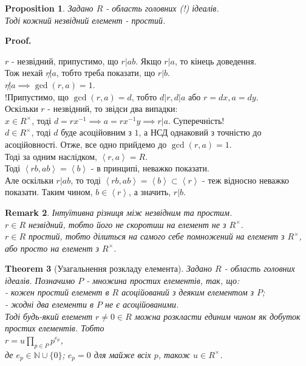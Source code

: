 \documentclass[a4paper, 14pt]{extarticle}
\makeatletter
\theoremstyle{theoremdd}
\newtheorem{theorem}{Theorem}[subsection]
\theoremstyle{theoremdd}
\theoremstyle{theoremdd}
\theoremstyle{theoremdd}
\theoremstyle{theoremdd}
\newtheorem{proposition}[theorem]{Proposition}
\theoremstyle{theoremdd}
\newtheorem{remark}[theorem]{Remark}
\theoremstyle{theoremdd}
\theoremstyle{theoremdd}
\def\qed{$\blacksquare$}
\renewenvironment{proof}[1][Proof.\\]{\par
\pushQED{\hfill \qed}%
\normalfont \topsep6\p@\@plus6\p@\relax
\trivlist
\item\relax
{\bfseries
#1\@addpunct{.}}\hspace\labelsep\ignorespaces
}{%
\popQED\endtrivlist\@endpefalse
}
\makeatother
\begin{document}
\begin{proposition}
Задано $R$ - область головних (!) ідеалів.\\
Тоді кожний незвідний елемент - простий.
\end{proposition}

\begin{proof}
$r$ - незвідний, припустимо, що $r | ab$. Якщо $r | a$, то кінець доведення.\\ Тож нехай $r \not | a$, тобто треба показати, що $r | b$.\\
$r \not| a \implies \gcd (r,a) = 1$.\\
!Припустимо, що $\gcd(r,a) = d$, тобто $d | r, d | a$ або $r = dx, a = dy$.\\
Оскільки $r$ - незвідний, то звідси два випадки:\\
$x \in R^\times$, тоді $d = rx^{-1} \implies a = rx^{-1}y \implies r | a$. Суперечність!\\
$d \in R^\times$, тоді $d$ буде асоційовним з $1$, а НСД однаковий з точністю до асоційовності. Отже, все одно прийдемо до $\gcd(r,a) = 1$.\\
Тоді за одним наслідком, $\left<r,a \right> = R$.\\
Тоді $\left<rb,ab \right> = \left< b \right>$ - в принципі, неважко показати.\\
Але оскільки $r | ab$, то тоді $\left<rb,ab \right> = \left< b \right> \subset \left< r \right>$ - теж відносно неважко показати. Таким чином, $b \in \left< r \right>$, а значить, $r | b$.
\end{proof}

\begin{remark}
Інтуїтивна різниця між незвідним та простим.\\
$r \in R$ незвідний, тобто його не скоротиш на елемент не з $R^\times$.\\
$r \in R$ простий, тобто ділиться на самого себе помножений на елемент з $R^\times$, або просто на елемент з $R^\times$.
\end{remark}

\begin{theorem}[Узагальнення розкладу елемента]
Задано $R$ - область головних ідеалів. Позначимо $P$ - множина простих елементів, так, що:\\
- кожен простий елемент в $R$ асоційований з деяким елементом з $P$;\\
- жодні два елементи в $P$ не є асоційованими.\\
Тоді будь-який елемент $r \neq 0 \in R$ можна розкласти единим чином як добуток простих елементів. Тобто\\
$r = u \displaystyle\prod_{p \in P} p^{e_p}$,\\
де $e_p \in \mathbb{N} \cup \{0\}$; $e_p = 0$ для майже всіх $p$, також $u \in R^\times$.
\end{theorem}
\end{document}
